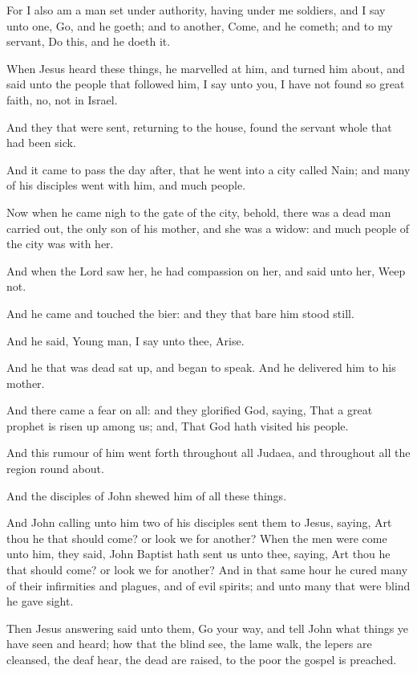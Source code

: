 \Verse For I also am a man set under authority, having under me soldiers, and I say unto one, Go, and he goeth; and to another, Come, and he cometh; and to my servant, Do this, and he doeth it.

\Verse When Jesus heard these things, he marvelled at him, and turned him about, and said unto the people that followed him, I say unto you, I have not found so great faith, no, not in Israel.

\Verse And they that were sent, returning to the house, found the servant whole that had been sick.

\Verse And it came to pass the day after, that he went into a city called Nain; and many of his disciples went with him, and much people.

\Verse Now when he came nigh to the gate of the city, behold, there was a dead man carried out, the only son of his mother, and she was a widow: and much people of the city was with her.

\Verse And when the Lord saw her, he had compassion on her, and said unto her, Weep not.

\Verse And he came and touched the bier: and they that bare him stood still.

And he said, Young man, I say unto thee, Arise.

\Verse And he that was dead sat up, and began to speak. And he delivered him to his mother.

\Verse And there came a fear on all: and they glorified God, saying, That a great prophet is risen up among us; and, That God hath visited his people.

\Verse And this rumour of him went forth throughout all Judaea, and throughout all the region round about.

\Verse And the disciples of John shewed him of all these things.

\Verse And John calling unto him two of his disciples sent them to Jesus, saying, Art thou he that should come? or look we for another?  \Verse When the men were come unto him, they said, John Baptist hath sent us unto thee, saying, Art thou he that should come? or look we for another?  \Verse And in that same hour he cured many of their infirmities and plagues, and of evil spirits; and unto many that were blind he gave sight.

\Verse Then Jesus answering said unto them, Go your way, and tell John what things ye have seen and heard; how that the blind see, the lame walk, the lepers are cleansed, the deaf hear, the dead are raised, to the poor the gospel is preached.


